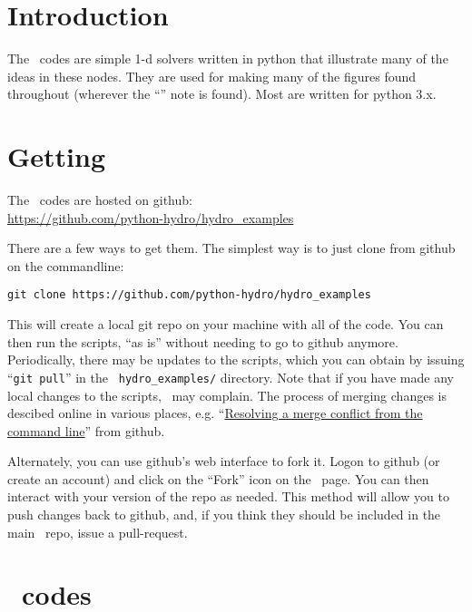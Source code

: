 \label{app:hydroex}

\section{Introduction}

The \hydroex\ codes are simple 1-d solvers written in python that
illustrate many of the ideas in these nodes.  They are used for making
many of the figures found throughout (wherever the ``\hydroexdoit{}''
note is found).  Most are written for python 3.x.

\section{Getting \hydroex}

The \hydroex\ codes are hosted on github:\\
\url{https://github.com/python-hydro/hydro_examples}

There are a few ways to get them.  The simplest way is to just clone
from github on the commandline:

\begin{verbatim}
git clone https://github.com/python-hydro/hydro_examples
\end{verbatim}

This will create a local git repo on your machine with all of the
code.  You can then run the scripts, ``as is'' without needing to go
to github anymore.  Periodically, there may be updates to the scripts,
which you can obtain by issuing ``{\tt git pull}'' in the {\tt
hydro\_examples/} directory.  Note that if you have made any local
changes to the scripts, \git\ may complain.  The process of merging
changes is descibed online in various places,
e.g. ``\href{https://help.github.com/articles/resolving-a-merge-conflict-from-the-command-line}{Resolving
a merge conflict from the command line}'' from github.

Alternately, you can use github's web interface to fork it.  Logon to
github (or create an account) and click on the ``Fork'' icon on the
\hydroex\ page.  You can then interact with your version of the repo
as needed.  This method will allow you to push changes back to github,
and, if you think they should be included in the main \hydroex\ repo,
issue a pull-request.

\section{\hydroex\ codes}

